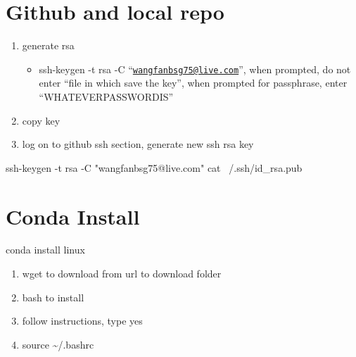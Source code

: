 \documentclass[
]{article}
\newenvironment{Shaded}{\begin{snugshade}}{\end{snugshade}}
\newcommand{\FunctionTok}[1]{\textcolor[rgb]{0.00,0.00,0.00}{#1}}
\newcommand{\NormalTok}[1]{#1}
\newcommand{\StringTok}[1]{\textcolor[rgb]{0.31,0.60,0.02}{#1}}
\providecommand{\tightlist}{%
  \setlength{\itemsep}{0pt}\setlength{\parskip}{0pt}}
\begin{document}
\hypertarget{github-and-local-repo}{%
\section{Github and local repo}\label{github-and-local-repo}}

\begin{enumerate}
\def\labelenumi{\arabic{enumi}.}
\tightlist
\item
  generate rsa

  \begin{itemize}
  \tightlist
  \item
    ssh-keygen -t rsa -C
    ``\href{mailto:wangfanbsg75@live.com}{\nolinkurl{wangfanbsg75@live.com}}'',
    when prompted, do not enter ``file in which save the key'', when
    prompted for passphrase, enter ``WHATEVERPASSWORDIS''
  \end{itemize}
\item
  copy key
\item
  log on to github ssh section, generate new ssh rsa key
\end{enumerate}

\begin{Shaded}
\begin{Highlighting}[]
\FunctionTok{ssh-keygen}\NormalTok{ -t rsa -C }\StringTok{"wangfanbsg75@live.com"}
\FunctionTok{cat}\NormalTok{ ~/.ssh/id_rsa.pub}
\end{Highlighting}
\end{Shaded}

\hypertarget{conda-install}{%
\section{Conda Install}\label{conda-install}}

conda install linux

\begin{enumerate}
\def\labelenumi{\arabic{enumi}.}
\tightlist
\item
  wget to download from url to download folder
\item
  bash to install
\item
  follow instructions, type yes
\item
  source \textasciitilde/.bashrc
\end{enumerate}
\end{document}
